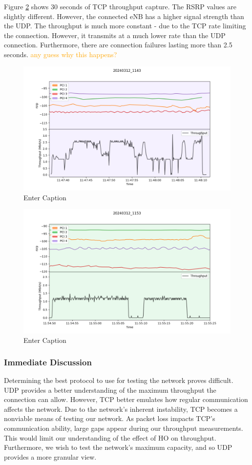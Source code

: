 Figure \ref{fig:4tcp} shows 30 seconds of TCP throughput capture. The RSRP values are slightly different. However, the connected eNB has a higher signal strength than the UDP. The throughput is much more constant - due to the TCP rate limiting the connection. However, it transmits at a much lower rate than the UDP connection. Furthermore, there are connection failures lasting more than 2.5 seconds. \textcolor{orange}{any guess why this happens?}
\begin{figure}
    \centering
    \includegraphics[width=0.5\linewidth]{src//img/4stationary_udp.png}
    \caption{Enter Caption}
    \label{fig:4udp}
\end{figure}
\begin{figure}
    \centering
    \includegraphics[width=0.5\linewidth]{src//img/4stationary_tcp.png}
    \caption{Enter Caption}
    \label{fig:4tcp}
\end{figure}

\subsubsection{Immediate Discussion}
Determining the best protocol to use for testing the network proves difficult. UDP provides a better understanding of the maximum throughput the connection can allow. However, TCP better emulates how regular communication affects the network.
Due to the network's inherent instability, TCP becomes a nonviable means of testing our network. As packet loss impacts TCP's communication ability, large gaps appear during our throughput measurements. This would limit our understanding of the effect of HO on throughput. Furthermore, we wish to test the network's maximum capacity, and so UDP provides a more granular view.

